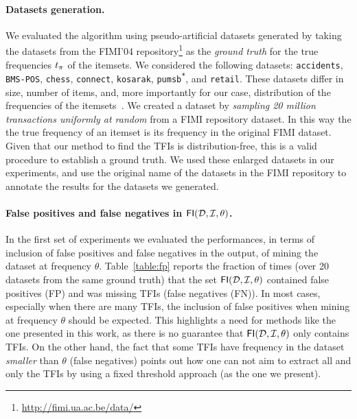 \paragraph*{Datasets generation.}\label{sec:dsgen}
We evaluated the algorithm using pseudo-artificial datasets generated by taking the datasets from the FIMI'04
repository\footnote{\url{http://fimi.ua.ac.be/data/}} as the \emph{ground truth} for the true frequencies
$t_\pi$ of the itemsets. We considered the following datasets:
\texttt{accidents}, %
\texttt{BMS-POS}, \texttt{chess},
\texttt{connect}, \texttt{kosarak}, \texttt{pumsb\textsuperscript{*}}, and
\texttt{retail}. %
These datasets differ in size, number of
items, and, more importantly for our case, distribution of the frequencies of the
itemsets~\citep{GoethalsZ04}. We
created a dataset by \emph{sampling 20 million transactions uniformly at random} from a FIMI
repository dataset. In this way the 
the true frequency of an itemset is its frequency in the
original FIMI dataset. Given that our method to find the TFIs is
distribution-free, this is a valid procedure to establish a ground truth. We used
these enlarged datasets in our experiments, and use the original name of the
datasets in the FIMI repository to annotate the results for the datasets we generated.

\paragraph*{False positives and false negatives in
$\mathsf{FI}({\cal D},{\cal I},\theta)$.}
In the first set of experiments we evaluated the performances, in terms of
inclusion of false positives and false negatives in the output, of mining the
dataset at frequency $\theta$. Table~\ref{table:fp} reports  
the fraction of times (over 20 datasets from the same
ground truth) that the set $\mathsf{FI}({\cal D},{\cal I},\theta)$ contained false positives
(FP) and was missing TFIs (false negatives (FN)). In most cases, especially when there are
many TFIs, the inclusion of false positives when mining at frequency $\theta$
should be expected. This highlights a need for methods like the one presented in
this work, as there is no guarantee that $\mathsf{FI}({\cal D},{\cal I},\theta)$
only contains TFIs. On the other hand,
the fact that some TFIs have frequency in the dataset \emph{smaller} than
$\theta$ (false negatives) points out how one can not aim to extract all and
only the TFIs by using a fixed threshold approach (as the one we present).

